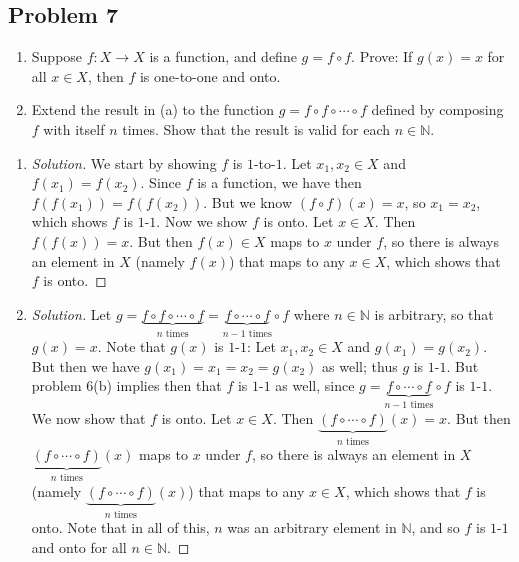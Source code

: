 \documentclass{article}
\newcommand{\N}{{\mathbb N}}
\begin{document}
\subsection*{Problem 7}
{\it \begin{enumerate}
	\item Suppose $f \colon X \to X$ is a function,
	and define $g = f \circ f$.
	Prove: If $g(x) = x$ for all $x \in X$, then $f$ is one-to-one and onto.
	\item Extend the result in (a) to the function $g = f\circ f \circ \cdots \circ f$
	defined by composing $f$ with itself $n$ times.
	Show that the result is valid for each $n \in \N$.
\end{enumerate}}
\begin{enumerate}
\item \begin{proof}[Solution]\let\qed\relax
We start by showing $f$ is $1$-to-$1$.
Let $x_1,x_2\in X$ and $f(x_1) = f(x_2)$.
Since $f$ is a function, we have then $f(f(x_1)) = f(f(x_2))$.
But we know $(f \circ f)(x) = x$, so
$x_1 = x_2$, which shows $f$ is $1$-$1$.
Now we show $f$ is onto.
Let $x \in X$.
Then $f(f(x)) = x$.
But then $f(x) \in X$ maps to $x$ under $f$,
so there is always an element in $X$ (namely $f(x)$) that maps to any $x\in X$,
which shows that $f$ is onto.
\end{proof}
\item \begin{proof}[Solution]\let\qed\relax
Let $g = \underbrace{f \circ f \circ \cdots \circ f}_{n \text{ times}} = \underbrace{f \circ \cdots \circ f}_{n-1 \text{ times}}\circ f$
where $n \in \N$ is arbitrary, so that $g(x) = x$.
Note that $g(x)$ is $1$-$1$:
Let $x_1, x_2 \in X$ and $g(x_1) = g(x_2)$.
But then we have $g(x_1) = x_1 = x_2 = g(x_2)$ as well;
thus $g$ is $1$-$1$.
But problem 6(b) implies then that $f$ is $1$-$1$ as well,
since $g = \underbrace{f \circ \cdots \circ f}_{n-1 \text{ times}}\circ f$ is $1$-$1$.
We now show that $f$ is onto.
Let $x \in X$.
Then $\underbrace{(f \circ \cdots \circ f)}_{n \text{ times}}(x) = x$.
But then $\underbrace{(f \circ \cdots \circ f)}_{n \text{ times}}(x)$
maps to $x$ under $f$,
so there is always an element in $X$ (namely $\underbrace{(f \circ \cdots \circ f)}_{n \text{ times}}(x)$)
that maps to any $x \in X$, which shows that $f$ is onto.
Note that in all of this, $n$ was an arbitrary element in $\N$,
and so $f$ is $1$-$1$ and onto for all $n \in \N$.
\end{proof}
\end{enumerate}
\clearpage
\end{document}
